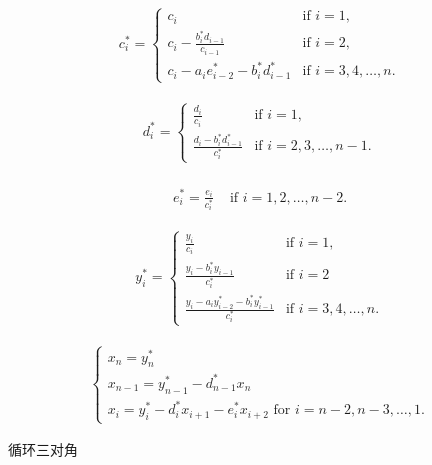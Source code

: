\documentclass[a4paper,10pt]{article}
\begin{document}
\begin{align}
    c^{*}_{i} = 
    \begin{cases}
        c_{i} & \text{if }i = 1, \\
        c_{i} - \frac{b^{*}_{i}d_{i-1}}{c_{i-1}} & \text{if }i = 2, \\
        c_{i} - a_{i}e^{*}_{i-2} -  b^{*}_{i}d^{*}_{i-1} &  \text{if }i = 3,4,\ldots,n.
    \end{cases}
\end{align}

\begin{align}
    d^{*}_{i} = 
    \begin{cases}
        \frac{d_{i}}{c_{i}} & \text{if }i = 1, \\
        \frac{d_{i} - b^{*}_{i}d^{*}_{i-1}}{c^{*}_{i}} & \text{if }i = 2,3,\ldots,n-1.
    \end{cases} \\
\end{align}

\begin{align}
    e^{*}_{i} =
        \frac{e_{i}}{c^{*}_{i}} & \text{ if }i = 1,2,\ldots,n-2.
\end{align}

\begin{align}
    y^{*}_{i} =
    \begin{cases}
        \frac{y_{i}}{c_{i}} & \text{if }i = 1, \\
        \frac{y_{i} - b^{*}_{i}y_{i-1}}{c^{*}_{i}} & \text{if }i = 2 \\
        \frac{y_{i} - a_{i}y^{*}_{i-2} - b^{*}_{i}y^{*}_{i-1}}{c^{*}_{i}} & \text{if }i = 3,4,\ldots,n.
    \end{cases}
\end{align}

\begin{align}
    \begin{cases}
        x_{n} = y^{*}_{n} \\
        x_{n-1} = y^{*}_{n-1} - d^{*}_{n-1}x_{n} \\
        x_{i} = y^{*}_{i} - d^{*}_{i}x_{i+1} - e^{*}_{i}x_{i+2} \text{ for } i = n-2,n-3,\ldots,1.
    \end{cases}
\end{align}


循环三对角
\end{document}
